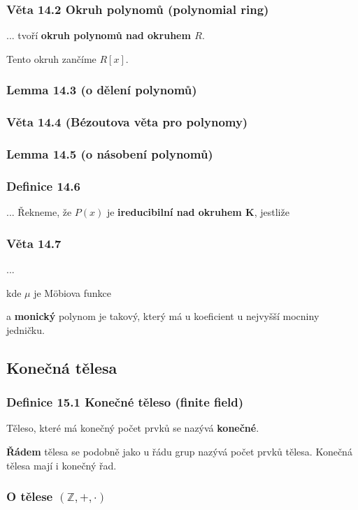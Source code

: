\documentclass[12pt, letterpaper]{article}
\begin{document}
\subsubsection*{Věta 14.2 Okruh polynomů (polynomial ring)}
... tvoří \textbf{okruh polynomů nad okruhem $R$}. 

Tento okruh zančíme $R[x]$.

\subsubsection*{Lemma 14.3 (o dělení polynomů)}

\subsubsection*{Věta 14.4 (Bézoutova věta pro polynomy)}

\subsubsection*{Lemma 14.5 (o násobení polynomů)}

\subsubsection*{Definice 14.6}
... Řekneme, že $P(x)$ je \textbf{ireducibilní nad okruhem K}, jestliže

\subsubsection*{Věta 14.7}
...

kde $\mu$ je Möbiova funkce

a \textbf{monický} polynom je takový, který má u koeficient u nejvyšší mocniny jedničku.

\subsection{Konečná tělesa}

\subsubsection*{Definice 15.1 Konečné těleso (finite field)}
Těleso, které má konečný počet prvků se nazývá \textbf{konečné}.

\textbf{Řádem} tělesa se podobně jako u řádu grup nazývá počet prvků tělesa.
Konečná tělesa mají i konečný řad.

\subsubsection*{O tělese $(\mathbb{Z}, +, \cdot)$}
\end{document}
